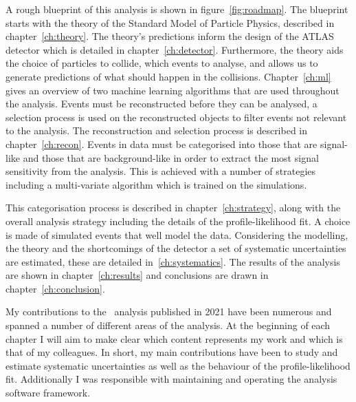 A rough blueprint of this analysis is shown in figure~\ref{fig:roadmap}.%
 The blueprint starts with the theory of
the Standard Model of Particle Physics, described in chapter~\ref{ch:theory}.
The theory's predictions inform the design of the ATLAS detector which is
detailed in chapter~\ref{ch:detector}. Furthermore, the theory aids the choice
of particles to collide, which events to analyse, and allows us to generate
predictions of what should happen in the collisions. Chapter~\ref{ch:ml} gives
an overview of two machine learning algorithms that are used throughout the
analysis. Events must be reconstructed before they can be analysed, a selection
process is used on the reconstructed objects to filter events not relevant to
the analysis. The reconstruction and selection process is described in
chapter~\ref{ch:recon}. Events in data must be categorised into those that are
signal-like and those that are background-like in order to extract the most
signal sensitivity from the analysis. This is achieved with a number of
strategies including a multi-variate algorithm which is trained on the
simulations.

This categorisation process is described in chapter~\ref{ch:strategy}, along
with the overall analysis strategy including the details of the
profile-likelihood fit. A choice is made of simulated events that well model the
data. Considering the modelling, the theory and the shortcomings of the detector
a set of systematic uncertainties are estimated, these are detailed
in~\ref{ch:systematics}. The results of the analysis are shown in
chapter~\ref{ch:results} and conclusions are drawn in
chapter~\ref{ch:conclusion}.

My contributions to the \VHbb\ analysis published in 2021 have been numerous and
spanned a number of different areas of the analysis. At the beginning of each
chapter I will aim to make clear which content represents my work and which is
that of my colleagues. In short, my main contributions have been to study and
estimate systematic uncertainties as well as the behaviour of the
profile-likelihood fit. Additionally I was responsible with maintaining and
operating the analysis software framework.

